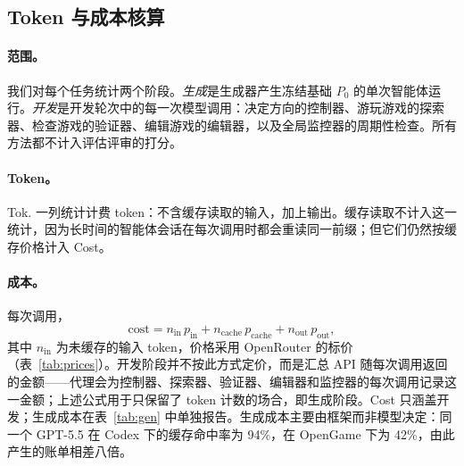 \subsection{Token 与成本核算}\label{app:cost}
\paragraph{范围。}我们对每个任务统计两个阶段。\emph{生成}是生成器产生冻结基础 $P_0$ 的单次智能体运行。\emph{开发}是开发轮次中的每一次模型调用：决定方向的控制器、游玩游戏的探索器、检查游戏的验证器、编辑游戏的编辑器，以及全局监控器的周期性检查。所有方法都不计入评估评审的打分。

\paragraph{Token。}Tok. 一列统计计费 token：不含缓存读取的输入，加上输出。缓存读取不计入这一统计，因为长时间的智能体会话在每次调用时都会重读同一前缀；但它们仍然按缓存价格计入 Cost。

\paragraph{成本。}每次调用，
\[
\text{cost} = n_{\text{in}}\,p_{\text{in}} + n_{\text{cache}}\,p_{\text{cache}} + n_{\text{out}}\,p_{\text{out}},
\]
其中 $n_{\text{in}}$ 为未缓存的输入 token，价格采用 OpenRouter 的标价（表~\ref{tab:prices}）。开发阶段并不按此方式定价，而是汇总 API 随每次调用返回的金额——代理会为控制器、探索器、验证器、编辑器和监控器的每次调用记录这一金额；上述公式用于只保留了 token 计数的场合，即生成阶段。Cost 只涵盖开发；生成成本在表~\ref{tab:gen} 中单独报告。生成成本主要由框架而非模型决定：同一个 GPT-5.5 在 Codex 下的缓存命中率为 94\%，在 OpenGame 下为 42\%，由此产生的账单相差八倍。

